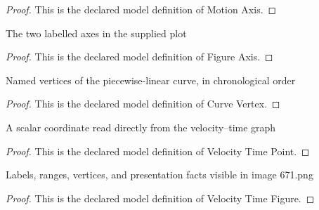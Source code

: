 \begin{proof}
  This is the declared model definition of Motion Axis.
\end{proof}
\begin{definition}
  \label{def:physics:phyx-mini-0671:phyxminiproblems-problemphyxmini0671-figureaxis}
  The two labelled axes in the supplied plot
\end{definition}
\begin{proof}
  This is the declared model definition of Figure Axis.
\end{proof}
\begin{definition}
  \label{def:physics:phyx-mini-0671:phyxminiproblems-problemphyxmini0671-curvevertex}
  Named vertices of the piecewise-linear curve, in chronological order
\end{definition}
\begin{proof}
  This is the declared model definition of Curve Vertex.
\end{proof}
\begin{definition}
  \label{def:physics:phyx-mini-0671:phyxminiproblems-problemphyxmini0671-velocitytimepoint}
  A scalar coordinate read directly from the velocity--time graph
\end{definition}
\begin{proof}
  This is the declared model definition of Velocity Time Point.
\end{proof}
\begin{definition}
  \label{def:physics:phyx-mini-0671:phyxminiproblems-problemphyxmini0671-velocitytimefigure}
  Labels, ranges, vertices, and presentation facts visible in image 671.png
\end{definition}
\begin{proof}
  This is the declared model definition of Velocity Time Figure.
\end{proof}
